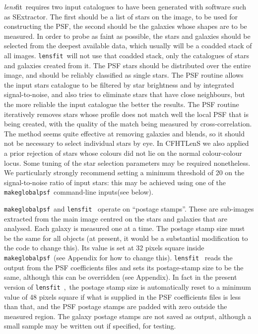 \documentclass{article}
\def\lensfit{{\tt lensfit}\ }
\def\makeglobalpsf{{\tt makeglobalpsf}\ }
\def\lensfitsuite{{\em lens}fit\ }
\begin{document}
\lensfitsuite requires two input catalogues to have been generated with software such as SExtractor. The first 
should be a list of stars on the image, to be used for constructing the PSF, the second should be the galaxies 
whose shapes are to be measured. In order to probe as faint as possible, the stars and galaxies should be
selected from the deepest available data, which usually will be a coadded stack of all images.  \lensfit will
not use that coadded stack, only the catalogues of stars and galaxies created from it.  
The PSF stars should be distributed over the entire image, and should 
be reliably classified as single stars. The PSF routine allows the input stars catalogue to be filtered by star 
brightness and by integrated signal-to-noise, and also tries to eliminate stars that have close neighbours, but the 
more reliable the input catalogue the better the results. The PSF routine iteratively 
removes stars whose profile does not match well the local PSF that is being created, with the quality of 
the match being measured by cross-correlation. The method seems quite effective at removing galaxies and 
blends, so it should not be necessary to select individual stars by eye. In CFHTLenS we also applied a prior
rejection of stars whose colours did not lie on the normal colour-colour locus.
Some tuning of the star selection 
parameters may be required nonetheless. We particularly strongly recommend setting a minimum threshold 
of 20 on the signal-to-noise ratio of input stars: this may be achieved using one of the 
\makeglobalpsf command-line inputs(see below). 

\makeglobalpsf and \lensfit 
operate on ``postage stamps''. These are sub-images extracted 
from the main image centred on the stars and galaxies that are analysed. Each galaxy is measured one at 
a time. The postage stamp size must be the same for all objects (at present, it would be a substantial 
modification to the code to change this). Its value is set at 32 pixels square inside 
\makeglobalpsf (see Appendix for how to change this). \lensfit 
reads the output from the PSF coefficients 
files and sets its postage-stamp size to be the same, although this can be overridden (see Appendix). In fact 
in the present version of \lensfit,\ the postage stamp size is automatically reset to a minimum value of 48 
pixels square if what is supplied in the PSF coefficients files is less than that, and the PSF postage stamps are
padded with zero outside the measured region. The galaxy postage stamps are not 
saved as output, although a small sample may be written out if specified, for testing. 
\end{document}
